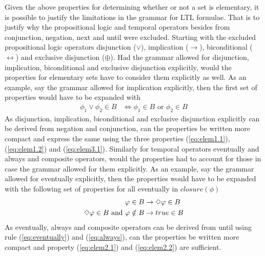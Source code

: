 Given the above properties for determining whether or not a set is elementary, it is possible to justify the limitations in the grammar for LTL formulae. That is to justify why the propositional logic and temporal operators besides from conjunction, negation, next and until were excluded. Starting with the excluded propositional logic operators disjunction ($\lor$), implication ($\to$), biconditional ($\leftrightarrow$) and exclusive disjunction ($\oplus$). Had the grammar allowed for disjunction, implication, biconditional and exclusive disjunction explicitly, would the properties for elementary sets have to consider them explicitly as well. As an example, say the grammar allowed for implication explicitly, then the first set of properties would have to be expanded with
\begin{align*}
    \phi_1 \lor \phi_2 \in B &\Leftrightarrow \phi_1 \in B \text{ or } \phi_2 \in B
\end{align*}
As disjunction, implication, biconditional and exclusive disjunction explicitly can be derived from negation and conjunction, can the properties be written more compact and express the same using the three properties (\ref{eq:elem1.1}), (\ref{eq:elem1.2}) and (\ref{eq:elem3.1}). Similarly for temporal operators eventually and always and composite operators, would the properties had to account for those in case the grammar allowed for them explicitly. As an example, say the grammar allowed for eventually explicitly, then the properties would have to be expanded with the following set of properties for all eventually in $closure(\phi)$
\begin{align*}
    \varphi \in B &\rightarrow \Diamond \varphi \in B \\
    \Diamond \varphi \in B \text{ and } \varphi \notin B &\rightarrow true \in B \label{eq:elem2.2}
\end{align*}
As eventually, always and composite operators can be derived from until using rule (\ref{eq:eventually}) and (\ref{eq:always}), can the properties be written more compact and property (\ref{eq:elem2.1}) and (\ref{eq:elem2.2}) are sufficient.

